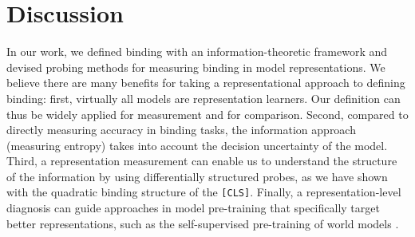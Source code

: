 \documentclass{article}
\theoremstyle{plain}
\theoremstyle{definition}
\theoremstyle{remark}
\begin{document}
\begin{table}[H]
    \caption{\textbf{Conditional binding information $\boldsymbol{\beta}^{*}_{\mathcal{O}, \mathcal{F}}(Z)$ for different models and datasets.} The ColorShape dataset here has 7 colors and 7 shapes, with feature and object code distributions detailed in Appendix \ref{ap:datasets}. VG:Color and VG:TopAttr are two subsets of Visual Genome.}
    \label{tab:main}
    \centering
\end{table}



\section*{Discussion}

In our work, we defined binding with an information-theoretic framework and devised probing methods for measuring binding in model representations. We believe there are many benefits for taking a representational approach to defining binding: first, virtually all models are representation learners. Our definition can thus be widely applied for measurement and for comparison. Second, compared to directly measuring accuracy in binding tasks, the information approach (measuring entropy) takes into account the decision uncertainty of the model. Third, a representation measurement can enable us to understand the structure of the information by using differentially structured probes, as we have shown with the quadratic binding structure of the \texttt{[CLS]}. Finally, a representation-level diagnosis can guide approaches in model pre-training that specifically target better representations, such as the self-supervised pre-training of world models \cite{assran2025vjepa2selfsupervisedvideo}. 
 
\end{document}
